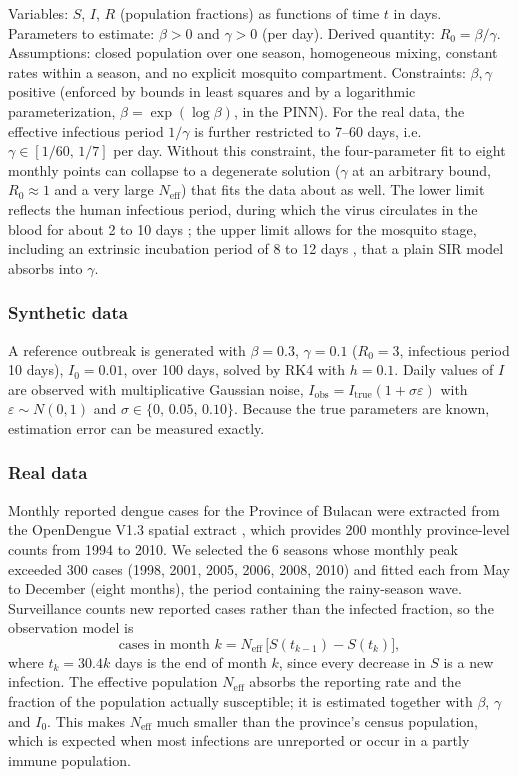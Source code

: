 \documentclass[12pt,a4paper]{article}
\newcommand{\Rzero}{R_0}
\newcommand{\Neff}{N_{\mathrm{eff}}}
\begin{document}
Variables: $S$, $I$, $R$ (population fractions) as functions of time $t$ in days. Parameters to estimate: $\beta>0$ and $\gamma>0$ (per day). Derived quantity: $\Rzero=\beta/\gamma$. Assumptions: closed population over one season, homogeneous mixing, constant rates within a season, and no explicit mosquito compartment. Constraints: $\beta,\gamma$ positive (enforced by bounds in least squares and by a logarithmic parameterization, $\beta=\exp(\log\beta)$, in the PINN). For the real data, the effective infectious period $1/\gamma$ is further restricted to 7--60 days, i.e.\ $\gamma\in[1/60,\,1/7]$ per day. Without this constraint, the four-parameter fit to eight monthly points can collapse to a degenerate solution ($\gamma$ at an arbitrary bound, $\Rzero\approx1$ and a very large $\Neff$) that fits the data about as well. The lower limit reflects the human infectious period, during which the virus circulates in the blood for about 2 to 10 days \citep{gubler1998}; the upper limit allows for the mosquito stage, including an extrinsic incubation period of 8 to 12 days \citep{gubler1998}, that a plain SIR model absorbs into $\gamma$.

\subsubsection*{Synthetic data}

A reference outbreak is generated with $\beta=0.3$, $\gamma=0.1$ ($\Rzero=3$, infectious period 10 days), $I_0=0.01$, over 100 days, solved by RK4 with $h=0.1$. Daily values of $I$ are observed with multiplicative Gaussian noise, $I_{\mathrm{obs}} = I_{\mathrm{true}}(1+\sigma\varepsilon)$ with $\varepsilon\sim N(0,1)$ and $\sigma\in\{0,\,0.05,\,0.10\}$. Because the true parameters are known, estimation error can be measured exactly.

\subsubsection*{Real data}

Monthly reported dengue cases for the Province of Bulacan were extracted from the OpenDengue V1.3 spatial extract \citep{clarke2024}, which provides 200 monthly province-level counts from 1994 to 2010. We selected the 6 seasons whose monthly peak exceeded 300 cases (1998, 2001, 2005, 2006, 2008, 2010) and fitted each from May to December (eight months), the period containing the rainy-season wave. Surveillance counts new reported cases rather than the infected fraction, so the observation model is
\begin{equation}
  \text{cases in month } k = \Neff\,\bigl[S(t_{k-1}) - S(t_k)\bigr],
  \label{eq:obs}
\end{equation}
where $t_k=30.4k$ days is the end of month $k$, since every decrease in $S$ is a new infection. The effective population $\Neff$ absorbs the reporting rate and the fraction of the population actually susceptible; it is estimated together with $\beta$, $\gamma$ and $I_0$. This makes $\Neff$ much smaller than the province's census population, which is expected when most infections are unreported or occur in a partly immune population.
\end{document}
